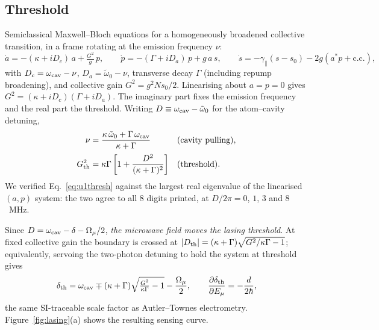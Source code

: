 \documentclass[11pt,a4paper]{article}
\newcommand{\Omu}{\Omega_{\mu}}
\newcommand{\wt}{\tilde{\omega}_{0}}
\begin{document}
\subsection{Threshold}

Semiclassical Maxwell--Bloch equations for a homogeneously broadened collective transition, in
a frame rotating at the emission frequency $\nu$:
\begin{equation}
  \dot a = -(\kappa + iD_c)\,a + \tfrac{G^2}{g}\,p, \qquad
  \dot p = -(\Gamma + iD_a)\,p + g\,a\,s, \qquad
  \dot s = -\gamma_\parallel(s-s_0) - 2g(a^*p + \mathrm{c.c.}),
\end{equation}
with $D_c=\omega_{\rm cav}-\nu$, $D_a=\wt-\nu$, transverse decay $\Gamma$ (including
repump broadening), and collective gain $G^2 = g^2Ns_0/2$. Linearising about $a=p=0$ gives
$G^2=(\kappa+iD_c)(\Gamma+iD_a)$. The imaginary part fixes the emission frequency and the real
part the threshold. Writing $D \equiv \omega_{\rm cav}-\wt$ for the atom--cavity detuning,
\begin{align}
  \nu &= \frac{\kappa\,\wt + \Gamma\,\omega_{\rm cav}}{\kappa+\Gamma}
        &&\text{(cavity pulling)},
        \label{eq:pull}\\[2pt]
  G^2_{\rm th} &= \kappa\Gamma\left[1 + \frac{D^2}{(\kappa+\Gamma)^2}\right]
        &&\text{(threshold)}.
        \label{eq:u1thresh}
\end{align}
We verified Eq.~\eqref{eq:u1thresh} against the largest real eigenvalue of the linearised
$(a,p)$ system: the two agree to all $8$ digits printed, at $D/2\pi = 0$, $1$, $3$ and $8$~MHz.

Since $D = \omega_{\rm cav}-\delta-\Omu/2$, \emph{the microwave field moves the lasing
threshold}. At fixed collective gain the boundary is crossed at
$|D_{\rm th}| = (\kappa+\Gamma)\sqrt{G^2/\kappa\Gamma - 1}$; equivalently, servoing the
two-photon detuning to hold the system at threshold gives
\begin{equation}
  \delta_{\rm th} = \omega_{\rm cav} \mp (\kappa+\Gamma)\sqrt{\tfrac{G^2}{\kappa\Gamma}-1}
  - \frac{\Omu}{2},
  \qquad
  \frac{\partial \delta_{\rm th}}{\partial E_\mu} = -\frac{d}{2\hbar},
\end{equation}
the same SI-traceable scale factor as Autler--Townes electrometry. Figure~\ref{fig:lasing}(a)
shows the resulting sensing curve.
\end{document}
